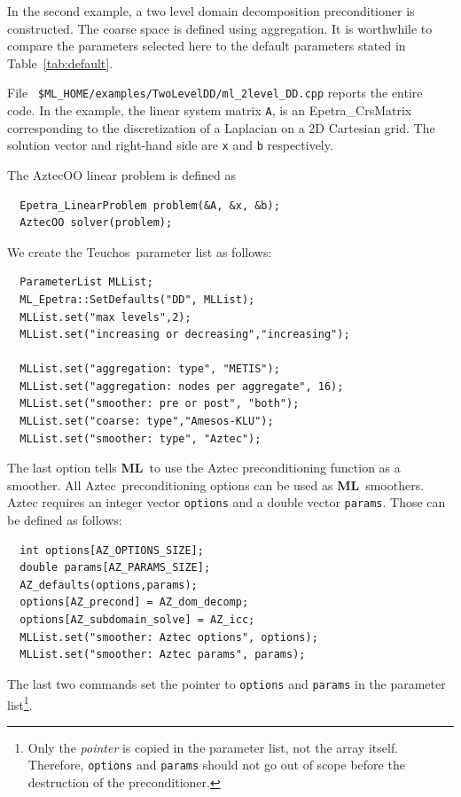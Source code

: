 \documentclass{article}[11pt]
\newcommand{\Aztec}  {{\sc Aztec}}
\newcommand{\ML}     {{\bf ML}}
\newcommand{\teuchos}  {{\sc Teuchos}}
\begin{document}
In the second example, 
a two level domain decomposition preconditioner is constructed.
The coarse space is defined using aggregation. 
It is worthwhile to compare the parameters selected here
to the default parameters stated in Table~\ref{tab:default}.

File {\tt
  \$ML\_HOME/examples/TwoLevelDD/ml\_2level\_DD.cpp}
reports the entire code.  In the example, the linear system matrix
\verb!A!,  is an Epetra\_CrsMatrix corresponding to the
discretization of a Laplacian on a 2D Cartesian grid. 
The solution vector and right-hand side are \verb!x! and \verb!b! respectively.

\noindent
The AztecOO linear problem is defined as
\begin{verbatim}
  Epetra_LinearProblem problem(&A, &x, &b);
  AztecOO solver(problem);
\end{verbatim}

\noindent
We create the \teuchos~parameter  list as follows:
\begin{verbatim}
  ParameterList MLList;
  ML_Epetra::SetDefaults("DD", MLList);
  MLList.set("max levels",2);
  MLList.set("increasing or decreasing","increasing");

  MLList.set("aggregation: type", "METIS");
  MLList.set("aggregation: nodes per aggregate", 16);
  MLList.set("smoother: pre or post", "both");
  MLList.set("coarse: type","Amesos-KLU");
  MLList.set("smoother: type", "Aztec");
\end{verbatim}
The last option tells \ML\ to use the {\sc Aztec} preconditioning
function as a smoother. All \Aztec~preconditioning options can be used
as \ML~smoothers.  {\sc Aztec} requires an integer vector \verb!options!
and a double vector \verb!params!. Those can be defined as follows:
\begin{verbatim}
  int options[AZ_OPTIONS_SIZE];
  double params[AZ_PARAMS_SIZE];
  AZ_defaults(options,params);
  options[AZ_precond] = AZ_dom_decomp;
  options[AZ_subdomain_solve] = AZ_icc;
  MLList.set("smoother: Aztec options", options);
  MLList.set("smoother: Aztec params", params);
\end{verbatim}
The last two commands set the pointer to {\tt options} and {\tt params}
in the parameter list\footnote{Only the {\sl pointer} is copied in the
  parameter list, not the array itself. Therefore, {\tt options} and
  {\tt params} should not go out of scope before the destruction of the
  preconditioner.}.
\end{document}
